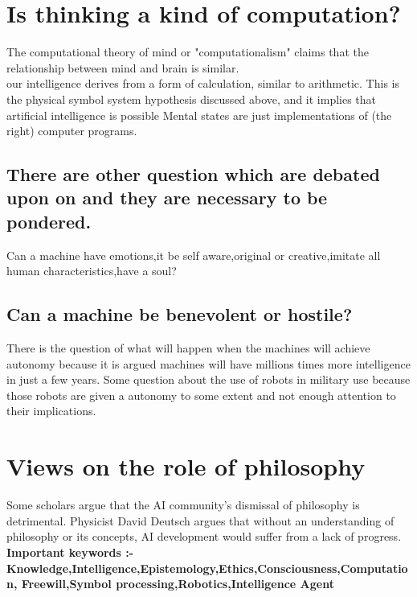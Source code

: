 \documentclass[a4paper,10pt]{article}
\begin{document}
\section{Is thinking a kind of computation?}
The computational theory of mind or "computationalism" claims that the relationship between mind and brain is similar. \\
our intelligence derives from a form of calculation, similar to arithmetic. This is the physical symbol system hypothesis discussed above, and it implies that artificial intelligence is possible
Mental states are just implementations of (the right) computer programs. \\
\subsection{There are other question which are debated upon on and they are necessary to be pondered. }
Can a machine have emotions,it be self aware,original or creative,imitate all human characteristics,have a soul?
\subsection{Can a machine be benevolent or hostile?}
There is the question of what will happen when the machines will achieve autonomy because it is argued machines will have millions times more intelligence in just a few years. Some question about the use of robots in military use because those robots are given a autonomy to some extent and not enough attention to their implications.
\section{Views on the role of philosophy}
Some scholars argue that the AI community's dismissal of philosophy is detrimental. Physicist David Deutsch argues that without an understanding of philosophy or its concepts, AI development would suffer from a lack of progress. \\

\textbf{Important keywords :- Knowledge,Intelligence,Epistemology,Ethics,Consciousness,Computation,
Freewill,Symbol processing,Robotics,Intelligence Agent }
\end{document}
